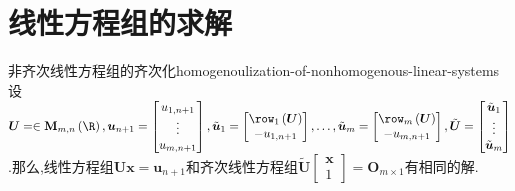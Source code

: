 \section{线性方程组的求解}

\begin{lemma}{非齐次线性方程组的齐次化}{homogenoulization-of-nonhomogenous-linear-systems}
	设$\boldsymbol{U}=\in\mathbf{M}_{m,n}\left(\R\right),\boldsymbol{u}_{n+1}=
	\begin{bmatrix}
		u_{1,n+1}\\
		\vdots\\
		u_{m,n+1}
	\end{bmatrix},
	\tilde{\boldsymbol{u}}_{1}=
	\begin{bmatrix}
		\row_{1}\left(\boldsymbol{U}\right)\\
		-u_{1,n+1}
	\end{bmatrix},
	\ldots,
	\tilde{\boldsymbol{u}}_{m}=
	\begin{bmatrix}
		\row_{m}\left(\boldsymbol{U}\right)\\
		-u_{m,n+1}
	\end{bmatrix},
	\tilde{\boldsymbol{U}}=
	\begin{bmatrix}
		\tilde{\boldsymbol{u}}_{1}\\
		\vdots\\
		\tilde{\boldsymbol{u}}_{m}
	\end{bmatrix}$.那么,线性方程组$\boldsymbol{U}\boldsymbol{x}=\boldsymbol{u}_{n+1}$和齐次线性方程组$\tilde{\boldsymbol{U}}
	\begin{bmatrix}
		\boldsymbol{x}\\
		1
	\end{bmatrix}
	=\boldsymbol{O}_{m\times 1}$有相同的解.
\end{lemma}

